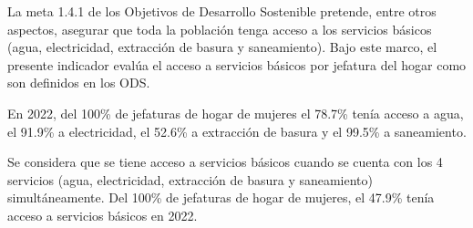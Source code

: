 La meta 1.4.1 de los Objetivos de Desarrollo Sostenible pretende, entre otros aspectos, asegurar que toda la población tenga acceso a los servicios básicos (agua, electricidad, extracción de basura y saneamiento). Bajo este marco, el presente indicador evalúa el acceso a servicios básicos por jefatura del hogar como son definidos en los ODS. 

En 2022, del 100\% de jefaturas de hogar de mujeres el 78.7\% tenía acceso a agua, el 91.9\% a electricidad, el 52.6\% a extracción de basura y el 99.5\% a saneamiento. 

Se considera que se tiene acceso a servicios básicos cuando se cuenta con los 4 servicios (agua, electricidad, extracción de basura y saneamiento) simultáneamente. Del 100\% de jefaturas de hogar de mujeres, el 47.9\% tenía acceso a servicios básicos en 2022. 